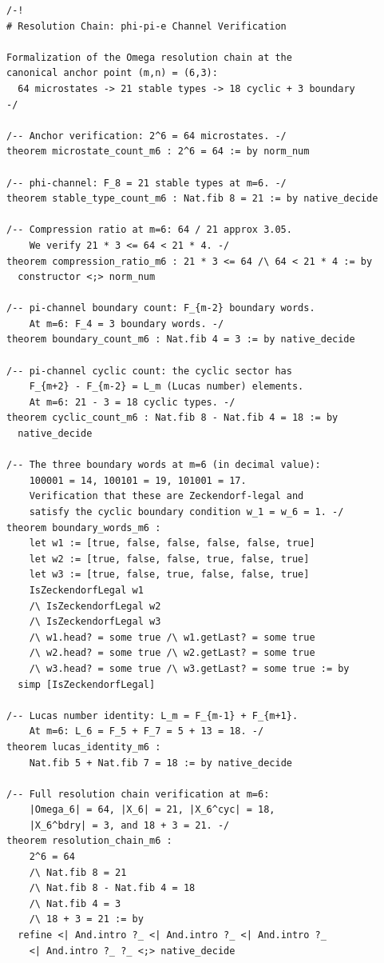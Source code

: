 \begin{lstlisting}[language=Lean4,caption={Resolution chain verification at $(m{,}n)=(6{,}3)$}]
/-!
# Resolution Chain: phi-pi-e Channel Verification

Formalization of the Omega resolution chain at the
canonical anchor point (m,n) = (6,3):
  64 microstates -> 21 stable types -> 18 cyclic + 3 boundary
-/

/-- Anchor verification: 2^6 = 64 microstates. -/
theorem microstate_count_m6 : 2^6 = 64 := by norm_num

/-- phi-channel: F_8 = 21 stable types at m=6. -/
theorem stable_type_count_m6 : Nat.fib 8 = 21 := by native_decide

/-- Compression ratio at m=6: 64 / 21 approx 3.05.
    We verify 21 * 3 <= 64 < 21 * 4. -/
theorem compression_ratio_m6 : 21 * 3 <= 64 /\ 64 < 21 * 4 := by
  constructor <;> norm_num

/-- pi-channel boundary count: F_{m-2} boundary words.
    At m=6: F_4 = 3 boundary words. -/
theorem boundary_count_m6 : Nat.fib 4 = 3 := by native_decide

/-- pi-channel cyclic count: the cyclic sector has
    F_{m+2} - F_{m-2} = L_m (Lucas number) elements.
    At m=6: 21 - 3 = 18 cyclic types. -/
theorem cyclic_count_m6 : Nat.fib 8 - Nat.fib 4 = 18 := by
  native_decide

/-- The three boundary words at m=6 (in decimal value):
    100001 = 14, 100101 = 19, 101001 = 17.
    Verification that these are Zeckendorf-legal and
    satisfy the cyclic boundary condition w_1 = w_6 = 1. -/
theorem boundary_words_m6 :
    let w1 := [true, false, false, false, false, true]
    let w2 := [true, false, false, true, false, true]
    let w3 := [true, false, true, false, false, true]
    IsZeckendorfLegal w1
    /\ IsZeckendorfLegal w2
    /\ IsZeckendorfLegal w3
    /\ w1.head? = some true /\ w1.getLast? = some true
    /\ w2.head? = some true /\ w2.getLast? = some true
    /\ w3.head? = some true /\ w3.getLast? = some true := by
  simp [IsZeckendorfLegal]

/-- Lucas number identity: L_m = F_{m-1} + F_{m+1}.
    At m=6: L_6 = F_5 + F_7 = 5 + 13 = 18. -/
theorem lucas_identity_m6 :
    Nat.fib 5 + Nat.fib 7 = 18 := by native_decide

/-- Full resolution chain verification at m=6:
    |Omega_6| = 64, |X_6| = 21, |X_6^cyc| = 18,
    |X_6^bdry| = 3, and 18 + 3 = 21. -/
theorem resolution_chain_m6 :
    2^6 = 64
    /\ Nat.fib 8 = 21
    /\ Nat.fib 8 - Nat.fib 4 = 18
    /\ Nat.fib 4 = 3
    /\ 18 + 3 = 21 := by
  refine <| And.intro ?_ <| And.intro ?_ <| And.intro ?_
    <| And.intro ?_ ?_ <;> native_decide


\end{lstlisting}
